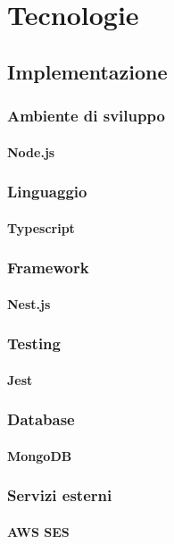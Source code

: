 \chapter{Tecnologie}
\kant[5]

\section{Implementazione}
\subsection{Ambiente di sviluppo}
\subsubsection{Node.js}
\kant[5]
\subsection{Linguaggio}
\subsubsection{Typescript}
\kant[5]
\subsection{Framework}
\subsubsection{Nest.js}
\kant[5]
\subsection{Testing}
\subsubsection{Jest}
\kant[5]
\subsection{Database}
\subsubsection{MongoDB}
\kant[5]
\subsection{Servizi esterni}
\subsubsection{AWS SES}
\kant[5]
